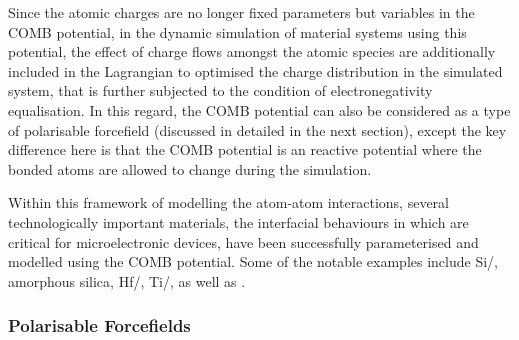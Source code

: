 Since the atomic charges are no longer  fixed parameters but variables in the COMB potential, in the dynamic simulation of material systems using this potential, the effect of charge flows amongst the atomic species are additionally included in the Lagrangian to optimised the charge distribution in the simulated system, that is further subjected to the condition of electronegativity equalisation.\cite{rappe1991charge,rick1994dynamical}  In this regard, the COMB potential can also be considered as a type of polarisable forcefield (discussed in detailed in the next section), except the key difference here is that the COMB potential is an reactive potential where the bonded atoms are allowed to change during the simulation.

Within this framework of modelling the atom-atom interactions, several technologically important materials, the interfacial behaviours in which are critical for microelectronic devices, have been successfully parameterised and modelled using the COMB potential. Some of the notable examples include Si/,\cite{yu2007charge} amorphous silica,\cite{shan2010second} Hf/,\cite{shan2010charge} Ti/,\cite{cheng2014charge} as well as .\cite{choudhary2015charge}


\subsubsection{Polarisable Forcefields}\label{sect:polarisable_FF}

